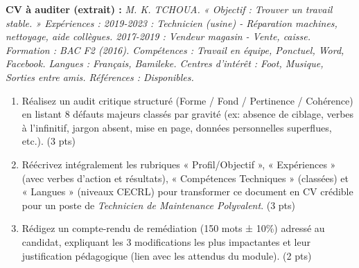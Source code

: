 \documentclass[11pt]{article}
\begin{document}
\begin{exercice}
\textbf{CV à auditer (extrait) :} \textit{M. K. TCHOUA. « Objectif : Trouver un travail stable. » Expériences : 2019-2023 : Technicien (usine) - Réparation machines, nettoyage, aide collègues. 2017-2019 : Vendeur magasin - Vente, caisse. Formation : BAC F2 (2016). Compétences : Travail en équipe, Ponctuel, Word, Facebook. Langues : Français, Bamileke. Centres d'intérêt : Foot, Musique, Sorties entre amis. Références : Disponibles. }
\begin{enumerate}
    \item Réalisez un audit critique structuré (Forme / Fond / Pertinence / Cohérence) en listant 8 défauts majeurs classés par gravité (ex: absence de ciblage, verbes à l'infinitif, jargon absent, mise en page, données personnelles superflues, etc.). (3 pts)
    \item Réécrivez intégralement les rubriques « Profil/Objectif », « Expériences » (avec verbes d'action et résultats), « Compétences Techniques » (classées) et « Langues » (niveaux CECRL) pour transformer ce document en CV crédible pour un poste de \textit{Technicien de Maintenance Polyvalent}. (3 pts)
    \item Rédigez un compte-rendu de remédiation (150 mots ± 10\%) adressé au candidat, expliquant les 3 modifications les plus impactantes et leur justification pédagogique (lien avec les attendus du module). (2 pts)
\end{enumerate}
\end{exercice}
\end{document}
